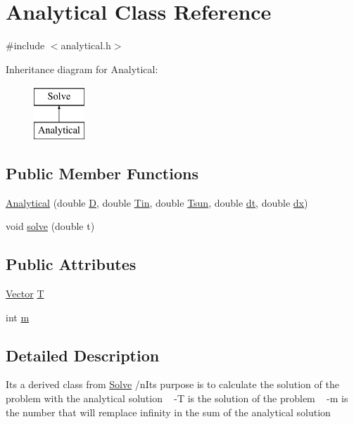 \hypertarget{class_analytical}{}\section{Analytical Class Reference}
\label{class_analytical}


{\ttfamily \#include $<$analytical.\+h$>$}

Inheritance diagram for Analytical\+:\begin{figure}[H]
\begin{center}
\leavevmode
\includegraphics[height=2.000000cm]{class_analytical}
\end{center}
\end{figure}
\subsection*{Public Member Functions}
\begin{DoxyCompactItemize}
\item 
\hyperlink{class_analytical_a5a2be7809dfe198c5d6bdc5b6448f75b}{Analytical} (double \hyperlink{class_solve_ab6b73352e9bca73bad1b133fc84f008c}{D}, double \hyperlink{class_solve_a324c747af91a26a206d7772853b8655e}{Tin}, double \hyperlink{class_solve_a7145536b49fb1ac4d2f36f800d118616}{Tsun}, double \hyperlink{class_solve_ac1befb9c006f895fb0517e19c412ca57}{dt}, double \hyperlink{class_solve_a21b9b8118f508e079f066d2ce2816dd1}{dx})
\item 
void \hyperlink{class_analytical_a8fe1d5769bb516115a31719222eb9ae5}{solve} (double t)
\end{DoxyCompactItemize}
\subsection*{Public Attributes}
\begin{DoxyCompactItemize}
\item 
\hyperlink{class_vector}{Vector} \hyperlink{class_analytical_abee1da12ac56489506088600823328eb}{T}
\item 
int \hyperlink{class_analytical_a3a6b8bb5c9985bdfba024ecc378fef14}{m}
\end{DoxyCompactItemize}


\subsection{Detailed Description}
It\textquotesingle{}s a derived class from \hyperlink{class_solve}{Solve} /n\+It\textquotesingle{}s purpose is to calculate the solution of the problem with the analytical solution ~\newline
-\/T is the solution of the problem ~\newline
-\/m is the number that will remplace infinity in the sum of the analytical solution


